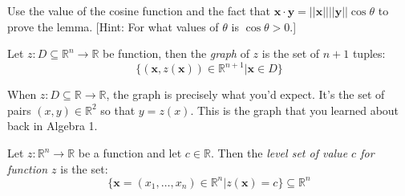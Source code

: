 \begin{exercise} Use the value of the cosine function and the fact that $\mathbf{x}\cdot\mathbf{y} = ||\mathbf{x}||||\mathbf{y}||\cos\theta$ to prove the lemma. [Hint: For what values of $\theta$ is $\cos\theta > 0$.]
\end{exercise}

\begin{definition}[Graph] Let $z:D \subseteq \mathbb{R}^n \rightarrow \mathbb{R}$ be function, then the \textit{graph} of $z$ is the set of $n+1$ tuples:
\begin{equation}
\{(\mathbf{x},z(\mathbf{x})) \in \mathbb{R}^{n+1} | \mathbf{x} \in D\}
\end{equation}
\label{def:Graph}
\end{definition}
When $z: D \subseteq \mathbb{R} \rightarrow \mathbb{R}$, the graph is precisely what you'd expect. It's the set of pairs $(x,y) \in \mathbb{R}^2$ so that $y = z(x)$. This is the graph that you learned about back in Algebra 1.  

\begin{definition} Let $z:\mathbb{R}^n \rightarrow \mathbb{R}$ be a function and let $c \in \mathbb{R}$. Then the \textit{level set of value $c$ for function $z$} is the set:
\begin{equation}
\{\mathbf{x}=(x_1,\dots,x_n) \in \mathbb{R}^n | z(\mathbf{x}) = c\} \subseteq \mathbb{R}^n
\end{equation} 
\label{def:LevelSet}
\end{definition}

